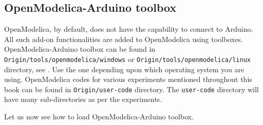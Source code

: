 \subsection{OpenModelica-Arduino toolbox}\label{sec:load-om-toolbox}
OpenModelica, by default, does not have the capability to connect to Arduino. 
All such add-on functionalities are added to OpenModelica using toolboxes.  
OpenModelica-Arduino toolbox can be found in {\tt Origin/tools/openmodelica/windows} or {\tt Origin/tools/openmodelica/linux} directory,
see .  Use the one depending upon
which operating system you are using. OpenModelica codes for various
experiments mentioned throughout this book can be found in {\tt Origin/user-code} directory. The {\tt user-code} directory will have
many sub-directories as per the experiments. 

Let us now see how to load OpenModelica-Arduino toolbox. 
